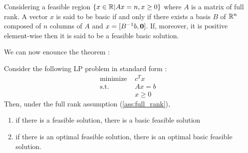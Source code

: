 \begin{definition}
    Considering a feasible region $\{x\in\mathbb R|Ax=n,x\ge 0\}$ where $A$ is a matrix of full rank.
    A vector $x$ is said to be basic if and only if there exists a basis $B$ of $\mathbb R^n$ composed of $n$ columns of $A$ and $x = [B^{-1}b, \textbf 0]$. If, moreover, it is positive element-wise then it is said to be a feasible basic solution. 
\end{definition}

We can now enounce the theorem :

\begin{theorem}
    \label{th:fundamental}
    Consider the following LP problem in standard form :
    \begin{align*}
        \textrm{minimize } & c^Tx\\
        \textrm{s.t. } & Ax = b\\
        & x \ge 0
    \end{align*}
    Then, under the full rank assumption (\ref{ass:full_rank}),
    \begin{enumerate}[label=(\roman*)]
        \item if there is a feasible solution, there is a basic feasible solution
        \item if there is an optimal feasible solution, there is an optimal basic feasible solution.
    \end{enumerate}
\end{theorem}
